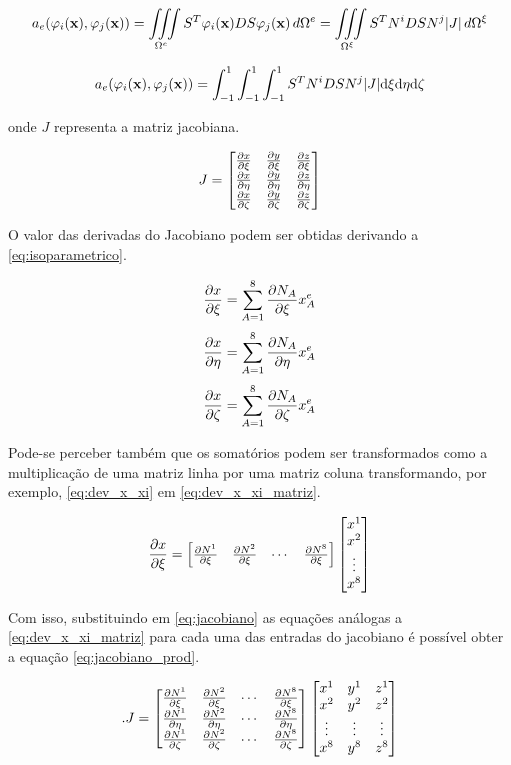 \begin{equation}
 a_e(\phiix,\phijx) = \omeeint{S^T\phiix D S\phijx} = \omeint[\Omega^\xi]{S^T N^i D S N^j |J|}
\end{equation}


\begin{equation}
 a_e(\phiix,\phijx) = \int^1_ {-1}\int^1_ {-1}\int^1_ {-1}{S^T N^i D S N^j |J|} \text{d}\xi \text{d}\eta \text{d}\zeta
\end{equation}

onde $J$ representa a matriz jacobiana.

\begin{equation}
J = \begin{bmatrix}
\dxi[x]   &   \dxi[y] &   \dxi[z] \\
\deta[x]  &  \deta[y] &  \deta[z] \\
\dzeta[x] & \dzeta[y] & \dzeta[z]
\end{bmatrix}
\label{eq:jacobiano}
\end{equation}

O valor das derivadas do Jacobiano podem ser obtidas derivando a \ref{eq:isoparametrico}.


\begin{equation}\label{eq:dev_x_xi}
\dxi[x] = \sum^8_{A=1} \dxi[N_A] x^e_A
\end{equation}
\begin{equation}
\deta[x] = \sum^8_{A=1} \deta[N_A] x^e_A
\end{equation}
\begin{equation}
\dzeta[x] = \sum^8_{A=1} \dzeta[N_A] x^e_A
\end{equation}



Pode-se perceber também que os somatórios podem ser transformados como a multiplicação de uma matriz linha por uma matriz coluna transformando, por exemplo, \ref{eq:dev_x_xi} em \ref{eq:dev_x_xi_matriz}.

\begin{equation}\label{eq:dev_x_xi_matriz}
\dxi[x] =
\begin{bmatrix}
 \dxi[N^1]   & \dxi[N^2] & \cdots & \dxi[N^8]
\end{bmatrix}
\begin{bmatrix}
x^1    \\
x^2    \\
\vdots  \\
x^8
\end{bmatrix}
\end{equation}

Com isso, substituindo em \ref{eq:jacobiano} as equações análogas a \ref{eq:dev_x_xi_matriz} para cada uma das entradas do jacobiano é possível obter a equação \ref{eq:jacobiano_prod}.


\begin{equation}\label{eq:jacobiano_prod}.
J = \der
\begin{bmatrix}
x^1 & y^1 & z^1 \\
x^2 & y^2 & z^2 \\
\vdots & \vdots  & \vdots  \\
x^8 & y^8 & z^8 \\
\end{bmatrix}
\end{equation}


